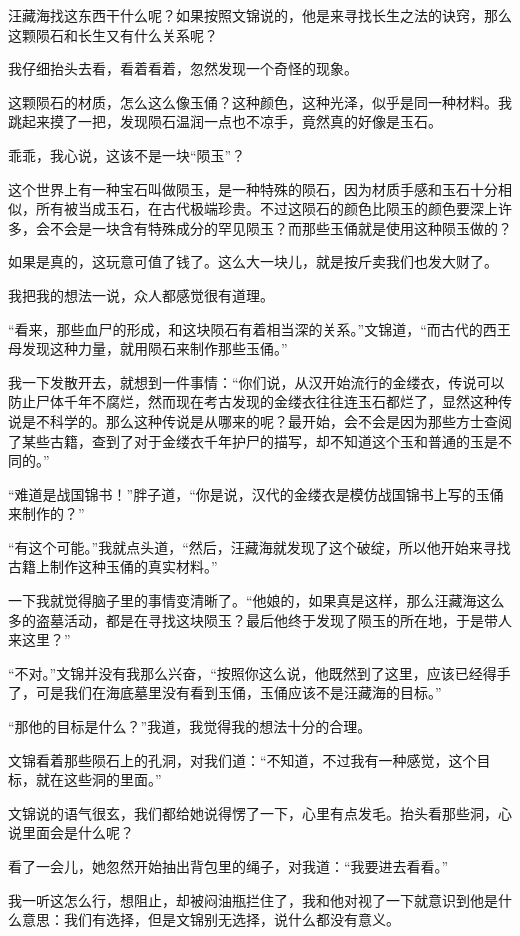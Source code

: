 汪藏海找这东西干什么呢？如果按照文锦说的，他是来寻找长生之法的诀窍，那么这颗陨石和长生又有什么关系呢？

我仔细抬头去看，看着看着，忽然发现一个奇怪的现象。

这颗陨石的材质，怎么这么像玉俑？这种颜色，这种光泽，似乎是同一种材料。我跳起来摸了一把，发现陨石温润一点也不凉手，竟然真的好像是玉石。

乖乖，我心说，这该不是一块“陨玉”？

这个世界上有一种宝石叫做陨玉，是一种特殊的陨石，因为材质手感和玉石十分相似，所有被当成玉石，在古代极端珍贵。不过这陨石的颜色比陨玉的颜色要深上许多，会不会是一块含有特殊成分的罕见陨玉？而那些玉俑就是使用这种陨玉做的？

如果是真的，这玩意可值了钱了。这么大一块儿，就是按斤卖我们也发大财了。

我把我的想法一说，众人都感觉很有道理。

“看来，那些血尸的形成，和这块陨石有着相当深的关系。”文锦道，“而古代的西王母发现这种力量，就用陨石来制作那些玉俑。”

我一下发散开去，就想到一件事情：“你们说，从汉开始流行的金缕衣，传说可以防止尸体千年不腐烂，然而现在考古发现的金缕衣往往连玉石都烂了，显然这种传说是不科学的。那么这种传说是从哪来的呢？最开始，会不会是因为那些方士查阅了某些古籍，查到了对于金缕衣千年护尸的描写，却不知道这个玉和普通的玉是不同的。”

“难道是战国锦书！”胖子道，“你是说，汉代的金缕衣是模仿战国锦书上写的玉俑来制作的？”

“有这个可能。”我就点头道，“然后，汪藏海就发现了这个破绽，所以他开始来寻找古籍上制作这种玉俑的真实材料。”

一下我就觉得脑子里的事情变清晰了。“他娘的，如果真是这样，那么汪藏海这么多的盗墓活动，都是在寻找这块陨玉？最后他终于发现了陨玉的所在地，于是带人来这里？”

“不对。”文锦并没有我那么兴奋，“按照你这么说，他既然到了这里，应该已经得手了，可是我们在海底墓里没有看到玉俑，玉俑应该不是汪藏海的目标。”

“那他的目标是什么？”我道，我觉得我的想法十分的合理。

文锦看着那些陨石上的孔洞，对我们道：“不知道，不过我有一种感觉，这个目标，就在这些洞的里面。”

文锦说的语气很玄，我们都给她说得愣了一下，心里有点发毛。抬头看那些洞，心说里面会是什么呢？

看了一会儿，她忽然开始抽出背包里的绳子，对我道：“我要进去看看。”

我一听这怎么行，想阻止，却被闷油瓶拦住了，我和他对视了一下就意识到他是什么意思：我们有选择，但是文锦别无选择，说什么都没有意义。


